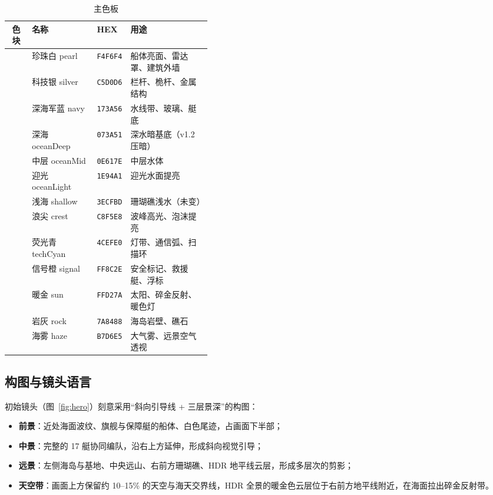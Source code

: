 \documentclass[UTF8, a4paper, 11pt]{ctexart}
\begin{document}
\begin{table}[H]
\centering
\caption{主色板}
\label{tab:palette}
\small
\begin{tabular}{@{}c l l p{0.40\linewidth}@{}}
\toprule
\textbf{色块} & \textbf{名称} & \textbf{HEX} & \textbf{用途} \\
\midrule
\cellcolor{palpearl}\rule{0pt}{2.2ex} & 珍珠白 pearl & \texttt{F4F6F4} & 船体亮面、雷达罩、建筑外墙 \\
\cellcolor{palsilver}\rule{0pt}{2.2ex} & 科技银 silver & \texttt{C5D0D6} & 栏杆、桅杆、金属结构 \\
\cellcolor{palnavy}\rule{0pt}{2.2ex} & 深海军蓝 navy & \texttt{173A56} & 水线带、玻璃、艇底 \\
\cellcolor{palhull}\rule{0pt}{2.2ex} & 深海 oceanDeep & \texttt{073A51} & 深水暗基底（v1.2 压暗） \\
\cellcolor{palmid}\rule{0pt}{2.2ex} & 中层 oceanMid & \texttt{0E617E} & 中层水体 \\
\cellcolor{pallight}\rule{0pt}{2.2ex} & 迎光 oceanLight & \texttt{1E94A1} & 迎光水面提亮 \\
\cellcolor{palshallow}\rule{0pt}{2.2ex} & 浅海 shallow & \texttt{3ECFBD} & 珊瑚礁浅水（未变） \\
\cellcolor{palcrest}\rule{0pt}{2.2ex} & 浪尖 crest & \texttt{C8F5E8} & 波峰高光、泡沫提亮 \\
\cellcolor{palcyan}\rule{0pt}{2.2ex} & 荧光青 techCyan & \texttt{4CEFE0} & 灯带、通信弧、扫描环 \\
\cellcolor{palorange}\rule{0pt}{2.2ex} & 信号橙 signal & \texttt{FF8C2E} & 安全标记、救援艇、浮标 \\
\cellcolor{palgold}\rule{0pt}{2.2ex} & 暖金 sun & \texttt{FFD27A} & 太阳、碎金反射、暖色灯 \\
\cellcolor{palrock}\rule{0pt}{2.2ex} & 岩灰 rock & \texttt{7A8488} & 海岛岩壁、礁石 \\
\cellcolor{palhaze}\rule{0pt}{2.2ex} & 海雾 haze & \texttt{B7D6E5} & 大气雾、远景空气透视 \\
\bottomrule
\end{tabular}
\end{table}

\subsection{构图与镜头语言}

初始镜头（图~\ref{fig:hero}）刻意采用“斜向引导线 + 三层景深”的构图：

\begin{itemize}
  \item \textbf{前景}：近处海面波纹、旗舰与保障艇的船体、白色尾迹，占画面下半部；
  \item \textbf{中景}：完整的 17 艇协同编队，沿右上方延伸，形成斜向视觉引导；
  \item \textbf{远景}：左侧海岛与基地、中央远山、右前方珊瑚礁、HDR 地平线云层，形成多层次的剪影；
  \item \textbf{天空带}：画面上方保留约 10--15\% 的天空与海天交界线，HDR 全景的暖金色云层位于右前方地平线附近，在海面拉出碎金反射带。
\end{itemize}
\end{document}
